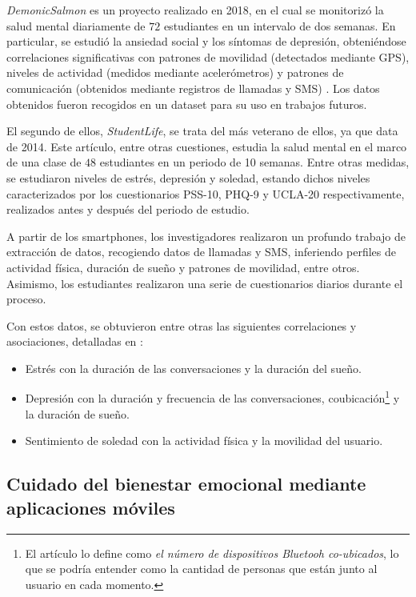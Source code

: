         \textit{DemonicSalmon} es un proyecto realizado en 2018, en el cual se monitorizó la salud mental diariamente de $72$ estudiantes en un intervalo de dos semanas. En particular, se estudió la ansiedad social y los síntomas de depresión, obteniéndose correlaciones significativas con patrones de movilidad (detectados mediante GPS), niveles de actividad (medidos mediante acelerómetros) y patrones de comunicación (obtenidos mediante registros de llamadas y SMS) \cite{boukhechba_demonicsalmon_2018}. Los datos obtenidos fueron recogidos en un \gls{dataset} para su uso en trabajos futuros.

        El segundo de ellos, \textit{StudentLife}, se trata del más veterano de ellos, ya que data de 2014. Este artículo, entre otras cuestiones, estudia la salud mental en el marco de una clase de $48$ estudiantes en un periodo de 10 semanas. Entre otras medidas, se estudiaron niveles de estrés, depresión y soledad, estando dichos niveles caracterizados por los cuestionarios PSS-10, PHQ-9 y UCLA-20 respectivamente, realizados antes y después del periodo de estudio.
        
        A partir de los \glspl{smartphone}, los investigadores realizaron un profundo trabajo de extracción de datos, recogiendo datos de llamadas y SMS, inferiendo perfiles de actividad física, duración de sueño y patrones de movilidad, entre otros. Asimismo, los estudiantes realizaron una serie de cuestionarios diarios durante el proceso.

        Con estos datos, se obtuvieron entre otras las siguientes correlaciones y asociaciones, detalladas en \cite{rui_studentlife_2014}:

        \begin{itemize}
            \item Estrés con la duración de las conversaciones y la duración del sueño.
            \item Depresión con la duración y frecuencia de las conversaciones, coubicación\footnote{El artículo lo define como \textit{el número de dispositivos Bluetooh co-ubicados}, lo que se podría entender como la cantidad de personas que están junto al usuario en cada momento.} y la duración de sueño.
            \item Sentimiento de soledad con la actividad física y la movilidad del usuario.
        \end{itemize}
    
    \subsection{Cuidado del bienestar emocional mediante aplicaciones móviles}
        \label{sec:estado_arte:apps}

